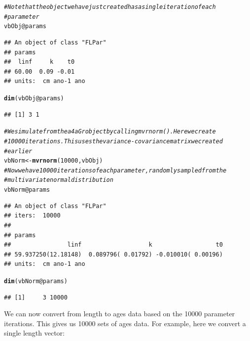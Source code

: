 \documentclass[a4paper,english,10pt]{article}\usepackage[]{graphicx}\usepackage[]{color}
\makeatletter
\newcommand{\hlnum}[1]{\textcolor[rgb]{0.686,0.059,0.569}{#1}}%
\newcommand{\hlcom}[1]{\textcolor[rgb]{0.678,0.584,0.686}{\textit{#1}}}%
\newcommand{\hlopt}[1]{\textcolor[rgb]{0,0,0}{#1}}%
\newcommand{\hlstd}[1]{\textcolor[rgb]{0.345,0.345,0.345}{#1}}%
\newcommand{\hlkwb}[1]{\textcolor[rgb]{0.69,0.353,0.396}{#1}}%
\newcommand{\hlkwc}[1]{\textcolor[rgb]{0.333,0.667,0.333}{#1}}%
\newcommand{\hlkwd}[1]{\textcolor[rgb]{0.737,0.353,0.396}{\textbf{#1}}}%
\newenvironment{kframe}{%
 \def\at@end@of@kframe{}%
 \ifinner\ifhmode%
  \def\at@end@of@kframe{\end{minipage}}%
  \begin{minipage}{\columnwidth}%
 \fi\fi%
 \def\FrameCommand##1{\hskip\@totalleftmargin \hskip-\fboxsep
 \colorbox{shadecolor}{##1}\hskip-\fboxsep
     \hskip-\linewidth \hskip-\@totalleftmargin \hskip\columnwidth}%
 \MakeFramed {\advance\hsize-\width
   \@totalleftmargin\z@ \linewidth\hsize
   \@setminipage}}%
 {\par\unskip\endMakeFramed%
 \at@end@of@kframe}
\newenvironment{knitrout}{}{} %
\makeatother
\begin{document}
\begin{knitrout}
\color{fgcolor}\begin{kframe}
\begin{alltt}
\hlcom{# Note that the object we have just created has a single iteration of each}
\hlcom{# parameter}
\hlstd{vbObj}\hlopt{@}\hlkwc{params}
\end{alltt}
\begin{verbatim}
## An object of class "FLPar"
## params
##  linf     k    t0 
## 60.00  0.09 -0.01 
## units:  cm ano-1 ano
\end{verbatim}
\begin{alltt}
\hlkwd{dim}\hlstd{(vbObj}\hlopt{@}\hlkwc{params}\hlstd{)}
\end{alltt}
\begin{verbatim}
## [1] 3 1
\end{verbatim}
\begin{alltt}
\hlcom{# We simulate from the a4aGr object by calling mvrnorm().  Here we create}
\hlcom{# 10000 iterations.  This uses the variance-covariance matrix we created}
\hlcom{# earlier}
\hlstd{vbNorm} \hlkwb{<-} \hlkwd{mvrnorm}\hlstd{(}\hlnum{10000}\hlstd{, vbObj)}
\hlcom{# Now we have 10000 iterations of each parameter, randomly sampled from the}
\hlcom{# multivariate normal distribution}
\hlstd{vbNorm}\hlopt{@}\hlkwc{params}
\end{alltt}
\begin{verbatim}
## An object of class "FLPar"
## iters:  10000 
## 
## params
##                linf                   k                  t0 
## 59.937250(12.18148)  0.089796( 0.01792) -0.010010( 0.00196) 
## units:  cm ano-1 ano
\end{verbatim}
\begin{alltt}
\hlkwd{dim}\hlstd{(vbNorm}\hlopt{@}\hlkwc{params}\hlstd{)}
\end{alltt}
\begin{verbatim}
## [1]     3 10000
\end{verbatim}
\end{kframe}
\end{knitrout}


We can now convert from length to ages data based on the 10000 parameter iterations. This gives us 10000 sets of ages data. For example, here we convert a single length vector: 
\end{document}
